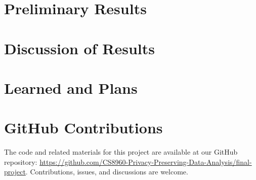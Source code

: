 \documentclass{article}
\begin{document}
    \break
    \section{Preliminary Results}\label{sec:prelim-results}
    

 
    \break
    \section{Discussion of Results}\label{sec:results-discussion}
    

    \break
    \section{Learned and Plans}\label{sec:learned-and-plans}
    

    
    


    \section*{GitHub Contributions}
    The code and related materials for this project are available at our GitHub repository:
    \url{https://github.com/CS8960-Privacy-Preserving-Data-Analysis/final-project}.
    Contributions, issues, and discussions are welcome.
\end{document}
